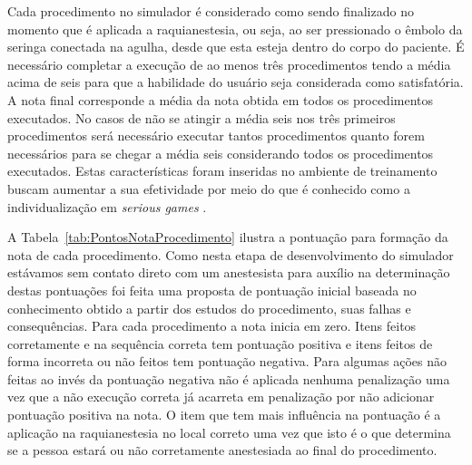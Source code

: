 Cada procedimento no simulador é considerado como sendo finalizado no momento que é aplicada a raquianestesia, ou seja, ao ser pressionado o êmbolo da seringa conectada na agulha, desde que esta esteja dentro do corpo do paciente.
É necessário completar a execução de ao menos três procedimentos tendo a média acima de seis para que a habilidade do usuário seja considerada como satisfatória. A nota final corresponde a média da nota obtida em todos os procedimentos executados. No casos de não se atingir a média seis nos três primeiros procedimentos será necessário executar tantos procedimentos quanto forem necessários para se chegar a média seis considerando todos os procedimentos executados. Estas características foram inseridas no ambiente de treinamento buscam aumentar a sua efetividade por meio do que é conhecido como a individualização em \textit{serious games} \cite{Sajjadi2022}.

A Tabela~\ref{tab:PontosNotaProcedimento} ilustra a pontuação para formação da nota de cada procedimento. Como nesta etapa de desenvolvimento do simulador estávamos sem contato direto com um anestesista para auxílio na determinação destas pontuações foi feita uma proposta de pontuação inicial baseada no conhecimento obtido a partir dos estudos do procedimento, suas falhas e consequências. Para cada procedimento a nota inicia em zero. Itens feitos corretamente e na sequência correta tem pontuação positiva e itens feitos de forma incorreta ou não feitos tem pontuação negativa. Para algumas ações não feitas ao invés da pontuação negativa não é aplicada nenhuma penalização uma vez que a não execução correta já acarreta em penalização por não adicionar pontuação positiva na nota. O item que tem mais influência na pontuação é a aplicação na raquianestesia no local correto uma vez que isto é o que determina se a pessoa estará ou não corretamente anestesiada ao final do procedimento.

